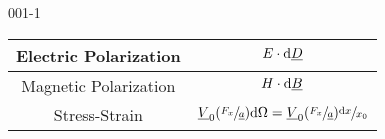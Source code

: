 \begin{mitframe}{001-1}
{\begin{tabular}{ | c | c |  }
	Electric Polarization & $\elecfield \cdot \mathrm{d}\uline{\elecdisplace}$ \\
            
	\hline
            
	Magnetic Polarization & $\magfield \cdot \mathrm{d}\uline{\magind}$ \\ \hline
            
	Stress-Strain & $\uline{\vol}_{\init}(\sfrac{\force_{\disp}}{\uline{\activity}})\mathrm{d}\mpc = \uline{\vol}_{\init}(\sfrac{\force_{\disp}}{\uline{\activity}})\sfrac{\mathrm{d}\disp}{\disp_{\init}} $ \\ \hline  %
            
\end{tabular}

}
\end{mitframe}
